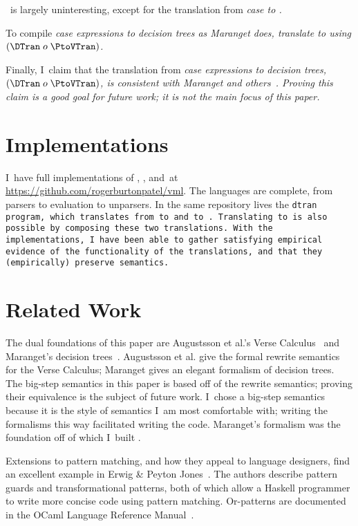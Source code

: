 \documentclass[manuscript,screen,review, 12pt, nonacm]{acmart}
\begin{document}
    \PtoVTran\ is largely uninteresting, except for the translation from
    \it{case} to \iffibf.
        
    To compile \it{case} expressions to decision trees as Maranget does,
    translate \PPlus to \D using $(\DTran\; o\; \PtoVTran)$.
    
    Finally, I~claim that the translation from \it{case} expressions to decision
    trees, $(\DTran\; o\; \PtoVTran)$, is consistent with Maranget and
    others~\citep{maranget,scottramsey}. Proving this claim is a good goal for
    future work; it is not the main focus of this paper. 

    \section{Implementations}

    I~have full implementations of \PPlus, \VMinus, and~\D at
    \url{https://github.com/rogerburtonpatel/vml}. The languages are complete,
    from parsers to evaluation to unparsers. In the same repository lives the
    \tt{dtran} program, which translates from \PPlus to \VMinus and \VMinus to
    \D. Translating \PPlus to \D is also possible by composing these two
    translations. With the implementations, I~have been able to gather
    satisfying empirical evidence of the functionality of the translations, and
    that they (empirically) preserve semantics. 


    \section{Related Work}

    The dual foundations of this paper are Augustsson et al.'s Verse
    Calculus~\citep{verse} and Maranget's decision trees~\citep{maranget}.
    Augustsson et al. give the formal rewrite semantics for the Verse Calculus;
    Maranget gives an elegant formalism of decision trees. The big-step
    semantics in this paper is based off of the rewrite semantics; proving their
    equivalence is the subject of future work. I~chose a big-step semantics
    because it is the style of semantics I~am most comfortable with; writing the
    formalisms this way facilitated writing the code. Maranget's formalism was
    the foundation off of which I~built \D. 
    
    Extensions to pattern matching, and how they appeal to language designers,
    find an excellent example in Erwig \& Peyton Jones~\citep{guardproposal}.
    The authors describe pattern guards and transformational patterns, both of
    which allow a Haskell programmer to write more concise code using pattern
    matching. Or-patterns are documented in the OCaml Language Reference
    Manual~\citep{ocaml}.
    
\end{document}
